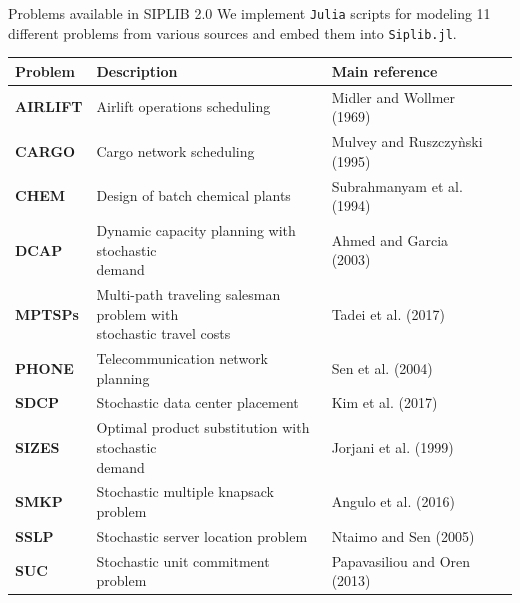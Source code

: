 \documentclass{beamer}
\def\ttiny{\fontsize{6pt}{6pt}\selectfont}
\newcommand{\siplibtwo}{\textsf{SIPLIB 2.0}}
\newcommand{\airlift}{\textsf{AIRLIFT}}
\newcommand{\chem}{\textsf{CHEM}}
\newcommand{\dcap}{\textsf{DCAP}}
\newcommand{\sdcp}{\textsf{SDCP}}
\newcommand{\mptsps}{\textsf{MPTSPs}}
\newcommand{\sizes}{\textsf{SIZES}}
\newcommand{\smkp}{\textsf{SMKP}}
\newcommand{\sslp}{\textsf{SSLP}}
\newcommand{\suc}{\textsf{SUC}}
\newcommand{\cargo}{\textsf{CARGO}}
\newcommand{\phone}{\textsf{PHONE}}
\newcommand{\siplibjl}{\texttt{Siplib.jl}}
\begin{document}
	\begin{frame}{Problems available in \siplibtwo}
		We implement \texttt{Julia} scripts for modeling 11 different problems from various sources and embed them into \siplibjl.
		\ttiny
		\begin{table}[H]
			\centering
			\label{table:problems}
			\begin{tabular}{@{}llll@{}}
				\toprule
				\textbf{Problem}		  		  & Description                                                        & Main reference              \\ \midrule
				\textbf{\airlift} & Airlift operations scheduling & Midler and Wollmer (1969)  \\
				\textbf{\cargo} & Cargo network scheduling  & Mulvey and Ruszczy\`{n}ski (1995) \\
				\textbf{\chem} & Design of batch chemical plants& Subrahmanyam et al. (1994) \\				
				\textbf{\dcap}         & \makecell[tl]{Dynamic capacity planning with stochastic\\ demand  }                  & Ahmed and Garcia (2003)                           \\
				\textbf{\mptsps}       & \makecell[tl]{Multi-path traveling salesman problem with\\ stochastic travel costs } & Tadei et al. (2017)                             \\
				\textbf{\phone}       & Telecommunication network planning & Sen et al. (2004)                            \\
				\textbf{\sdcp} 	& Stochastic data center placement  & Kim et al. (2017) \\
				\textbf{\sizes}        & \makecell[tl]{Optimal product substitution with stochastic\\ demand}         & Jorjani et al. (1999)        \\
				\textbf{\smkp}		  & Stochastic multiple knapsack problem                               & Angulo et al. (2016)                           \\
				\textbf{\sslp}         & Stochastic server location problem                                 & Ntaimo and Sen (2005)                           \\
				\textbf{\suc}         & Stochastic unit commitment problem			               & Papavasiliou and Oren (2013)                        \\ \bottomrule
			\end{tabular}%
		\end{table}
	\end{frame}
\end{document}
